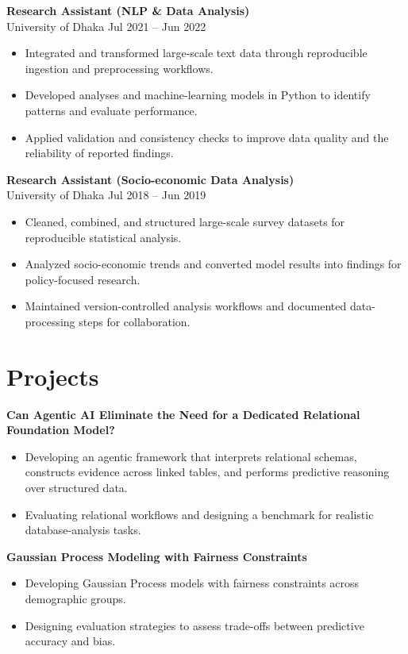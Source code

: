 \documentclass[10pt, letterpaper]{article}
\begin{document}
   \textbf{Research Assistant (NLP \& Data Analysis)} \\
   University of Dhaka \hfill Jul 2021 -- Jun 2022
   \begin{itemize}
    \item Integrated and transformed large-scale text data through reproducible ingestion and preprocessing workflows.
    \item Developed analyses and machine-learning models in Python to identify patterns and evaluate performance.
    \item Applied validation and consistency checks to improve data quality and the reliability of reported findings.
\end{itemize}

\textbf{Research Assistant (Socio-economic Data Analysis)} \\
University of Dhaka \hfill Jul 2018 -- Jun 2019
\begin{itemize}
    \item Cleaned, combined, and structured large-scale survey datasets for reproducible statistical analysis.
    \item Analyzed socio-economic trends and converted model results into findings for policy-focused research.
    \item Maintained version-controlled analysis workflows and documented data-processing steps for collaboration.
\end{itemize}

    
    \section*{Projects}
    \textbf{Can Agentic AI Eliminate the Need for a Dedicated Relational Foundation Model?}
    \begin{itemize}
        \item Developing an agentic framework that interprets relational schemas, constructs evidence across linked tables, and performs predictive reasoning over structured data.
        \item Evaluating relational workflows and designing a benchmark for realistic database-analysis tasks.
    \end{itemize}

    \textbf{Gaussian Process Modeling with Fairness Constraints} \\
    \begin{itemize}
    \item Developing Gaussian Process models with fairness constraints across demographic groups.
    \item Designing evaluation strategies to assess trade-offs between predictive accuracy and bias.
    \end{itemize}
\end{document}

